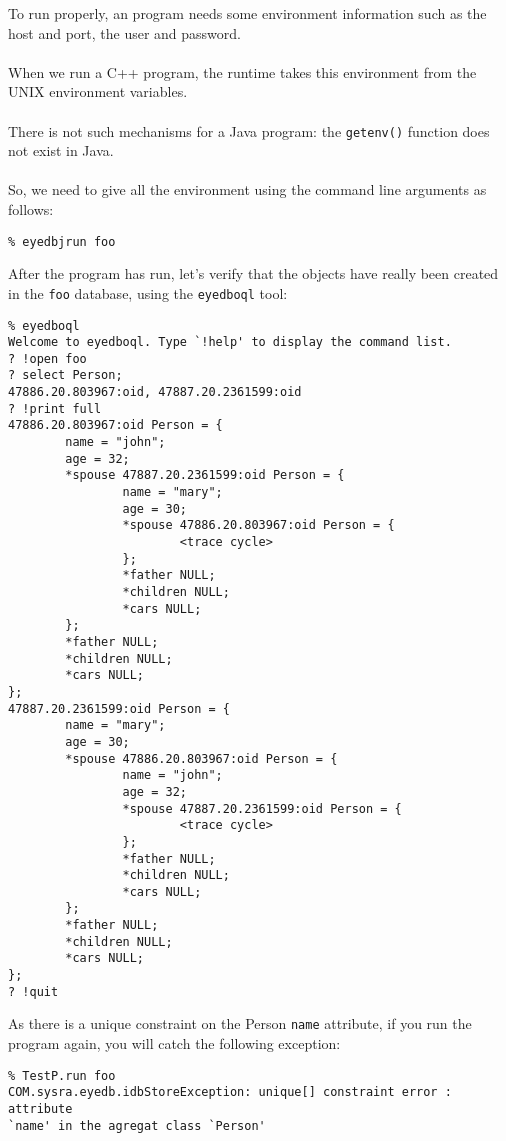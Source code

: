 To run properly, an \eyedb program needs some environment information such
as the \eyedb host and port, the \eyedb user and password.
\\
\\
When we run a C++ program, the \eyedb runtime takes this environment
from the UNIX environment variables.
\\
\\
There is not such mechanisms for a Java program: the \texttt{getenv()} function
does not exist in Java.
\\
\\
So, we need to give all the environment using the command line arguments
as follows:
\verbsize \begin{verbatim}
% eyedbjrun foo
\end{verbatim}
\normalsize
After the program has run, let's verify that the objects have really been
created in the \texttt{foo} database, using the \texttt{eyedboql} tool:
{\verbsize \begin{verbatim}
% eyedboql
Welcome to eyedboql. Type `!help' to display the command list.
? !open foo
? select Person;
47886.20.803967:oid, 47887.20.2361599:oid
? !print full
47886.20.803967:oid Person = { 
        name = "john";
        age = 32;
        *spouse 47887.20.2361599:oid Person = { 
                name = "mary";
                age = 30;
                *spouse 47886.20.803967:oid Person = { 
                        <trace cycle>
                };
                *father NULL;
                *children NULL;
                *cars NULL;
        };
        *father NULL;
        *children NULL;
        *cars NULL;
};
47887.20.2361599:oid Person = { 
        name = "mary";
        age = 30;
        *spouse 47886.20.803967:oid Person = { 
                name = "john";
                age = 32;
                *spouse 47887.20.2361599:oid Person = { 
                        <trace cycle>
                };
                *father NULL;
                *children NULL;
                *cars NULL;
        };
        *father NULL;
        *children NULL;
        *cars NULL;
};
? !quit
\end{verbatim}
}
As there is a unique constraint on the Person \texttt{name} attribute,
if you run the program again, you will catch the following exception:
{\verbsize \begin{verbatim}
% TestP.run foo
COM.sysra.eyedb.idbStoreException: unique[] constraint error : attribute
`name' in the agregat class `Person'
\end{verbatim}
}
